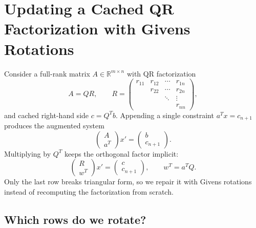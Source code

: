 \documentclass[letterpaper, 12pt]{article}
\begin{document}
\section*{Updating a Cached QR Factorization with Givens Rotations}

Consider a full-rank matrix $A \in \mathbb{R}^{m \times n}$ with QR factorization
\[
    A = Q R, \qquad R = \begin{pmatrix}
        r_{11} & r_{12} & \cdots & r_{1n} \\
                & r_{22} & \cdots & r_{2n} \\
                &        & \ddots & \vdots \\
                &        &        & r_{nn}
    \end{pmatrix},
\]
and cached right-hand side $c = Q^T b$. Appending a single constraint $a^T x = c_{n+1}$ produces the augmented system
\[
    \begin{pmatrix}
        A \\ a^T
    \end{pmatrix} x' = \begin{pmatrix}
        b \\ c_{n+1}
    \end{pmatrix}.
\]
Multiplying by $Q^T$ keeps the orthogonal factor implicit:
\[
    \begin{pmatrix}
        R \\ w^T
    \end{pmatrix} x' = \begin{pmatrix}
        c \\ c_{n+1}
    \end{pmatrix}, \qquad w^T = a^T Q.
\]
Only the last row breaks triangular form, so we repair it with Givens rotations instead of recomputing the factorization from scratch.

\subsection*{Which rows do we rotate?}
\end{document}
